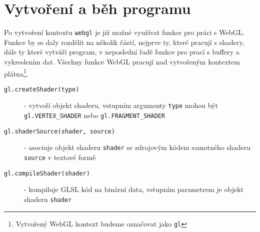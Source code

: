 






\section*{Vytvoření a běh programu}
Po vytvoření kontextu \texttt{webgl} je již možné využívat funkce pro práci s WebGL. Funkce by se daly rozdělit na několik částí, nejprve ty, které pracují s shadery, dále ty které vytváří program, v neposlední řadě funkce pro prací s buffery a vykreslením dat. Všechny funkce WebGL pracují nad vytvořeným kontextem plátna\footnote{Vytvořený WebGL kontext budeme označovat jako \texttt{gl}}.

\begin{description}
	\item[\texttt{gl.createShader(type)}] - vytvoří objekt shaderu, vstupním argumenty \texttt{type} mohou být \\ \texttt{gl.VERTEX\_SHADER} nebo \texttt{gl.FRAGMENT\_SHADER}
	
	\item[\texttt{gl.shaderSource(shader, source)}] - asociuje objekt shaderu \texttt{shader} se zdrojovým kódem samotného shaderu \texttt{source} v textové formě
	
	\item[\texttt{gl.compileShader(shader)}] - kompiluje GLSL kód na binární data, vstupním parametrem je objekt shaderu \texttt{shader}
	
\end{description}

